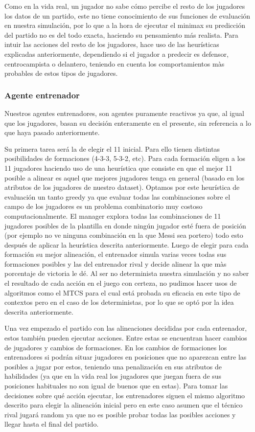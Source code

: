 \documentclass{article}
\begin{document}
Como en la vida real, un jugador no sabe cómo percibe el resto de los jugadores los datos de un partido, este no 
tiene conocimiento de sus funciones de evaluación en nuestra simulación, por lo que a la hora de ejecutar el minimax 
su predicción del partido no es del todo exacta, haciendo su pensamiento más realista. Para intuir las acciones del 
resto de los jugadores, hace uso de las heurísticas explicadas anteriormente, dependiendo si el jugador a predecir 
es defensor, centrocampista o delantero, teniendo en cuenta los comportamientos màs probables de estos tipos de 
jugadores.

\subsubsection{Agente entrenador}
Nuestros agentes entrenadores, son agentes puramente reactivos ya que, al igual que los jugadores, basan 
su decisión enteramente en el presente, sin referencia a lo que haya pasado anteriormente.

Su primera tarea será la de elegir el 11 inicial. Para ello tienen distintas posibilidades de formaciones 
(4-3-3, 5-3-2, etc). Para cada formación eligen a los 11 jugadores haciendo uso de una heurística que consiste en 
que el mejor 11 posible a alinear es aquel que mejores jugadores tenga en general (basado en los atributos de los 
jugadores de nuestro dataset). Optamos por este heurística de evaluación un tanto greedy ya que evaluar todas las 
combinaciones sobre el campo de los jugadores es un problema combinatorio muy costoso computacionalmente. El manager 
explora todas las combinaciones de 11 jugadores posibles de la plantilla en donde ningún jugador esté fuera de 
posición (por ejemplo no ve ninguna combinación en la que Messi sea portero) todo esto después de aplicar la 
heurística descrita anteriormente. Luego de elegir para cada formación su mejor alineación, el entrenador simula 
varias veces todas sus formaciones posibles y las del entrenador rival y decide alinear la que màs porcentaje de 
victoria le dé. Al ser no determinista nuestra simulación y no saber el resultado de cada acción en el juego con 
certeza, no pudimos hacer usos de algoritmos como el MTCS para el cual está probada su eficacia en este tipo de 
contextos pero en el caso de los deterministas, por lo que se optó por la idea descrita anteriormente.

Una vez empezado el partido con las alineaciones decididas por cada entrenador, estos también pueden ejecutar 
acciones. Entre estas se encuentran hacer cambios de jugadores y cambios de formaciones. En los cambios de 
formaciones los entrenadores si podrán situar jugadores en posiciones que no aparezcan entre las posibles a jugar 
por estos, teniendo una penalización en sus atributos de habilidades (ya que en la vida real los jugadores que juegan 
fuera de sus posiciones habituales no son igual de buenos que en estas). Para tomar las decisiones sobre qué acción 
ejecutar, los entrenadores siguen el mismo algoritmo descrito para elegir la alineación inicial pero en este caso 
asumen que el técnico rival jugará random ya que no es posible probar todas las posibles acciones y llegar hasta el 
final del partido.
\end{document}
